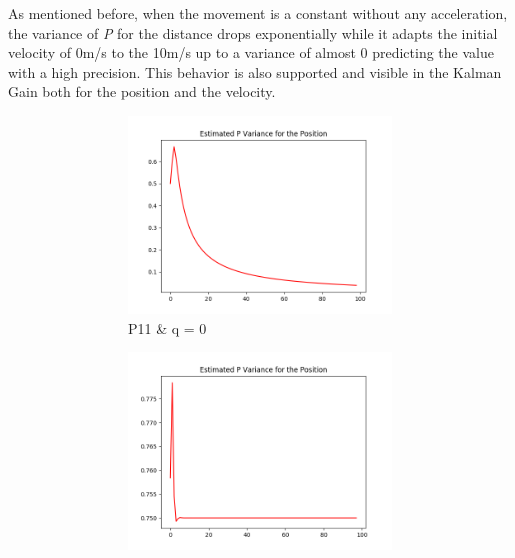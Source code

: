 \documentclass{article}
\begin{document}
        As mentioned before, when the movement is a constant without any acceleration, the variance of \textit{P} for the distance drops exponentially while it
        adapts the initial velocity of 0m/s to the 10m/s up to a variance of almost 0 predicting the value with a high precision. This behavior is also supported
        and visible in the Kalman Gain both for the position and the velocity.
        
        \begin{figure}[H]
            \centering 
            \begin{subfigure}{1\textwidth}  
                \begin{subfigure}{.3\textwidth}  
                    \includegraphics[width=1\linewidth]{./img/p11_0.png}
                    \caption{P11 \& q = 0 }
                \end{subfigure}
                \begin{subfigure}{.3\textwidth}  
                    \includegraphics[width=1\linewidth]{./img/p11_1.png}

\end{subfigure}
\end{subfigure}
\end{figure}
\end{document}
